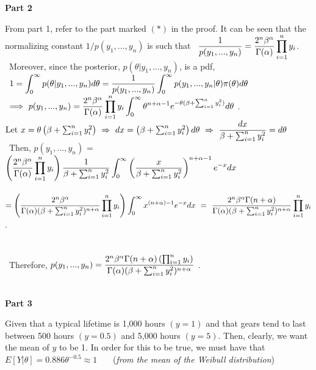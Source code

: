 \documentclass[10pt,a4paper]{article}
\begin{document}
\begin{flushleft}
\textbf{Part 2}
\end{flushleft}
From part 1, refer to the part marked $(\ast)$ in the proof. It can be seen that the normalizing constant $1/p(y_1, ..., y_n)$ is such that \ $\mathlarger{\frac{1}{p(y_1, ..., y_n)} = \frac{2^n\beta^{\alpha}}{\Gamma(\alpha)}\prod_{i=1}^{n}y_i}$. \ 
Moreover, since the posterior, $p(\theta\vert y_1, ..., y_n)$, is a pdf, 
\\\
$\mathlarger{1 = \int_0^{\infty}p(\theta\vert y_1, ..., y_n)d\theta = \frac{1}{p(y_1, ..., y_n)}\int_0^{\infty}p(y_1,...,y_n\vert\theta)\pi(\theta)d\theta}$
\\\
$\Longrightarrow \ p(y_1, ..., y_n) = \mathlarger{\frac{2^n\beta^{\alpha}}{\Gamma(\alpha)}\prod_{i=1}^{n}y_i\int_0^{\infty}\theta^{n+\alpha-1}e^{-\theta(\beta + \sum_{i=1}^{n}y_i^2)}d\theta}$ . $\\\mathrm{Let} \ x = \theta\left(\beta + \sum_{i=1}^{n}y_i^2\right) \ \Rightarrow \ dx = \left(\beta + \sum_{i=1}^{n}y_i^2\right)d\theta \ \Rightarrow \ \mathlarger{\frac{dx}{\beta + \sum_{i=1}^{n}y_i^2} = d\theta}$
\\\
Then, $p(y_1, ..., y_n)$ = $\mathlarger{\left(\frac{2^n\beta^{\alpha}}{\Gamma(\alpha)}\prod_{i=1}^{n}y_i\right)\frac{1}{\beta + \sum_{i=1}^{n}y_i^2}\int_0^{\infty}\left(\frac{x}{\beta + \sum_{i=1}^{n}y_i^2}\right)^{n+\alpha-1}e^{-x}dx}$
\\\ 
$=\mathlarger{\left(\frac{2^n\beta^{\alpha}}{\Gamma(\alpha)(\beta + \sum_{i=1}^{n}y_i^2)^{n+\alpha}}\prod_{i=1}^{n}y_i\right)\int_0^{\infty}x^{(n+\alpha)-1}e^{-x}dx \ = \ \frac{2^n\beta^{\alpha}\Gamma(n+\alpha)}{\Gamma(\alpha)(\beta + \sum_{i=1}^{n}y_i^2)^{n+\alpha}}\prod_{i=1}^{n}y_i}$.
\\\
\\\
\\\
Therefore, $p(y_1,...,y_n) = \mathlarger{\frac{2^n\beta^{\alpha}\Gamma(n+\alpha)\left(\prod_{i=1}^{n}y_i\right)}{\Gamma(\alpha)(\beta + \sum_{i=1}^{n}y_i^2)^{n+\alpha}}}$ .
\\\
\newpage
\begin{flushleft}
\textbf{Part 3}
\end{flushleft}
Given that a typical lifetime is 1,000 hours $(y = 1)$ and that gears tend to last between 500 hours $(y = 0.5)$ and 5,000 hours $(y = 5)$. Then, clearly, we want the mean of $y$ to be 1. In order for this to be true, we must have that
$E[Y|\theta]=0.886\theta^{-0.5} \approx 1$ \ \ \ (\textit{from the mean of the Weibull distribution})\\
\end{document}
